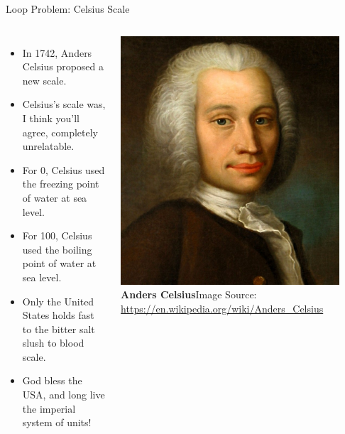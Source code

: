 \documentclass[xcolor=table]{beamer}
\begin{document}
\begin{frame}{Loop Problem: Celsius Scale}
  \begin{columns}
    \begin{itemize}[<+->]
      \item In 1742, Anders Celsius proposed a new scale.
      \item Celsius's scale was, I think you'll agree, completely unrelatable.
      \item For 0, Celsius used the freezing point of water at sea level.
      \item For 100, Celsius used the boiling point of water at sea level.
      \item Only the United States holds fast to the bitter salt slush to blood scale.
      \item God bless the USA, and long live the imperial system of units!
    \end{itemize}

    \begin{center}
      \includegraphics[width=0.9\textwidth]{images/celsius}
      {\tiny\newline\textbf{Anders Celsius}\newline Image Source: \url{https://en.wikipedia.org/wiki/Anders_Celsius}}
    \end{center}
  \end{columns}
\end{frame}
\end{document}
